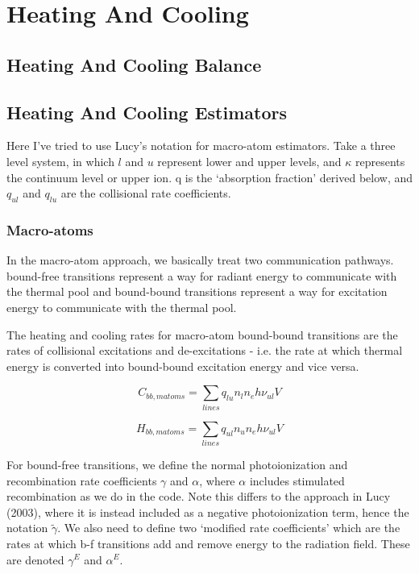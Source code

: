 \section{Heating And Cooling}

\subsection{Heating And Cooling Balance}

\subsection{Heating And Cooling Estimators}


Here I've tried to use Lucy's notation for macro-atom estimators. Take a three level system, in
which $l$ and $u$ represent lower and upper levels, 
and $\kappa$ represents the continuum level or upper ion.
q is the `absorption fraction' derived below, and $q_{ul}$ and $q_{lu}$ are the collisional
rate coefficients.

\subsubsection{Macro-atoms}

\noindent
In the macro-atom approach, we basically treat two communication pathways.
bound-free transitions represent a way
for radiant energy to communicate with the thermal pool
and bound-bound transitions represent a way
for excitation energy to communicate with the thermal pool.
\bigskip

\noindent
The heating and cooling rates for macro-atom bound-bound transitions are the rates of
collisional excitations and de-excitations
- i.e. the rate at which thermal energy is converted into
bound-bound excitation energy and vice versa.

\begin{equation}
C_{bb,matoms} = \sum_{lines} q_{lu} n_l n_e h \nu_{ul} V
\end{equation}

\begin{equation}
H_{bb,matoms} = \sum_{lines} q_{ul} n_u n_e h \nu_{ul} V
\end{equation}

\noindent
For bound-free transitions, we define the normal photoionization and recombination
rate coefficients $\gamma$ and $\alpha$, where $\alpha$ includes
stimulated recombination as we do in the code. Note
this differs to the approach in Lucy (2003), where it is instead included as a 
negative photoionization term, hence the notation $\widetilde{\gamma}$.
We also need to define two `modified rate coefficients' which 
are the rates at which b-f transitions add and remove energy to the radiation field.
These are denoted $\gamma^E$ and $\alpha^E$.

